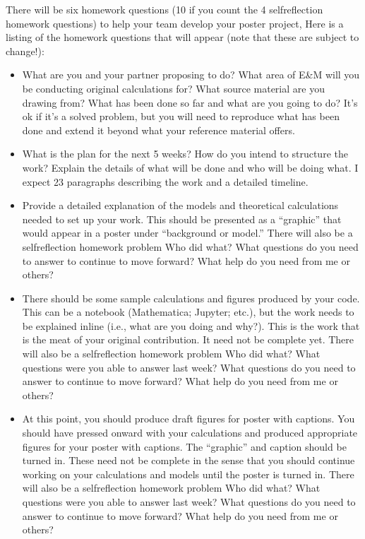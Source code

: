 \documentclass[letterpaper,10pt,english]{jupyterBook}
\begin{document}
\sphinxAtStartPar
There will be six homework questions (10 if you count the 4 self\sphinxhyphen{}reflection homework questions) to help your team develop your poster project, Here is a  listing of the homework questions that will appear (note that these are subject to change!):
\begin{itemize}
\item {} 
\sphinxAtStartPar
{} \sphinxhyphen{} What are you and your partner proposing to do? What area of E\&M will you be conducting original calculations for? What source material are you drawing from? What has been done so far and what are you going to do? It’s ok if it’s a solved problem, but you will need to reproduce what has been done and extend it beyond what your reference material offers.

\item {} 
\sphinxAtStartPar
{} \sphinxhyphen{} What is the plan for the next 5 weeks? How do you intend to structure the work? Explain the details of what will be done and who will be doing what. I expect 2\sphinxhyphen{}3 paragraphs describing the work and a detailed timeline.

\item {} 
\sphinxAtStartPar
{} \sphinxhyphen{} Provide a detailed explanation of the models and theoretical calculations needed to set up your work. This should be presented as a “graphic” that would appear in a poster under “background or model.” There will also be a self\sphinxhyphen{}reflection homework problem \sphinxhyphen{} Who did what? What questions do you need to answer to continue to move forward? What help do you need from me or others?

\item {} 
\sphinxAtStartPar
{} \sphinxhyphen{} There should be some sample calculations and figures produced by your code. This can be a notebook (Mathematica; Jupyter; etc.), but the work needs to be explained inline (i.e., what are you doing and why?). This is the work that is the meat of your original contribution. It need not be complete yet. There will also be a self\sphinxhyphen{}reflection homework problem \sphinxhyphen{} Who did what? What questions were you able to answer last week? What questions do you need to answer to continue to move forward? What help do you need from me or others?

\item {} 
\sphinxAtStartPar
{} \sphinxhyphen{} At this point, you should produce draft figures for poster with captions. You should have pressed onward with your calculations and produced appropriate figures for your poster with captions. The “graphic” and caption should be turned in. These need not be complete in the sense that you should continue working on your calculations and models until the poster is turned in. There will also be a self\sphinxhyphen{}reflection homework problem \sphinxhyphen{} Who did what? What questions were you able to answer last week? What questions do you need to answer to continue to move forward? What help do you need from me or others?


\end{itemize}
\end{document}
